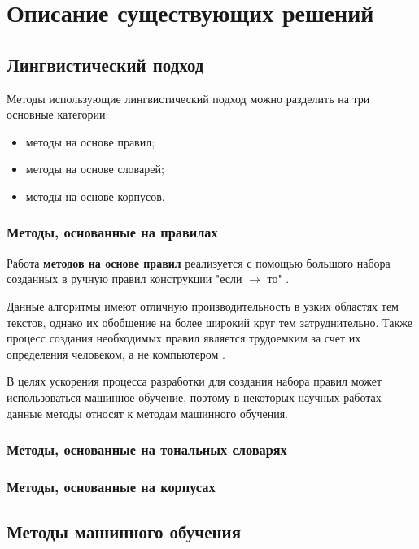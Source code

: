 \chapter{Описание существующих решений}

\section{Лингвистический подход}

Методы использующие лингвистический подход можно разделить на три основные
категории:
\begin{itemize}
    \item методы на основе правил;
    \item методы на основе словарей;
    \item методы на основе корпусов.
\end{itemize}

\subsection{Методы, основанные на правилах}

Работа \textbf{методов на основе правил} реализуется с помощью большого набора
созданных в ручную правил конструкции "если $\rightarrow$ то" \cite{article14}.

Данные алгоритмы имеют отличную производительность в узких
областях тем текстов, однако их обобщение на более широкий круг тем
затруднительно. Также процесс создания необходимых правил является
трудоемким за счет их определения человеком, а не компьютером \cite{article15}.

В целях ускорения процесса разработки для создания набора правил может
использоваться машинное обучение, поэтому в некоторых научных работах
\cite{article16} \cite{article17} данные методы относят к методам машинного
обучения.

\subsection{Методы, основанные на тональных словарях}

\subsection{Методы, основанные на корпусах}

\section{Методы машинного обучения}

